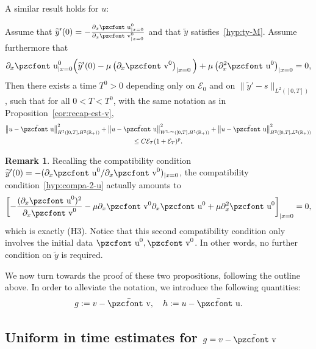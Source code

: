 \documentclass[10pt]{amsart}
\theoremstyle{definition}\newtheorem{defi}[theo]{Definition}\newtheorem{rema}[theo]{Remark}\newtheorem{exam}[theo]{Example}\newtheorem{exem}[theo]{Example}\newtheorem{nota}[theo]{Notation}
\newcommand{\mathpzc}[1]{\text{\pzcfont #1}}
\newcommand{\R}{\mathbb{R}}
\newcommand{\p}{\partial}
\newcommand{\bv}{\bar{\mathpzc{v}}}
\newcommand{\bu}{\bar{\mathpzc{u}}}
\newcommand{\cE}{\mathcal E}
\newcommand{\tv}{\mathpzc{v}}
\newcommand{\tu}{\mathpzc{u}}
\newcommand{\ty}{\widetilde{y}}
\begin{document}
A similar result holds for $u$:
\begin{prop}\label{prop:est-u}
Assume that $\ty'(0)=-\frac{\p_x \tu^0_{|x=0}}{\p_x \tv^0_{|x=0}}$ and that $\ty$ satisfies~\eqref{hyp:ty-M}. Assume furthermore that
\begin{equation}\label{hyp:compa-2-u}
\partial_x \tu^0_{|x=0}\Big(\ty'(0) -\mu \left(\partial_x \tv^0\right)_{|x=0} \Big) + \mu \left(\partial^2_x \tu^0\right)_{|x=0} = 0,
\end{equation}
Then there exists a time $T^0>0$ depending only on $\cE_0$ and on $\|\ty'-s\|_{L^2([0,T])}$, such that for all $0<T<T^0$, with the same notation as in Proposition~\ref{cor:recap-est-v},
\begin{multline*}
\left\|u-\bu\right\|_{H^1\left([0,T], H^2(\R_+)\right)}^2 + \left\|u-\bu\right\|_{W^{1,\infty}\left([0,T], H^1(\R_+)\right)}^2 + \left\|u-\bu\right\|_{H^2\left([0,T], L^2(\R_+)\right)}^2\\
\leq C \cE_T (1+ \cE_T)^p.
\end{multline*}
\end{prop}

\begin{rema}
Recalling the compatibility condition $\ty'(0)=-(\p_x \tu^0/\p_x \tv^0)_{|x=0}$, the compatibility condition~\eqref{hyp:compa-2-u} actually amounts to
\[
\left[-\frac{(\p_x \tu^0)^2}{\p_x \tv^0} - \mu \p_x \tv^0 \p_x \tu^0 + \mu \p_x^2 \tu^0\right]_{|x=0}=0,
\]
which is exactly (H3). Notice that this second compatibility condition only involves the initial data $\tu^0, \tv^0$. In other words, no further condition on $\ty$ is required.
\end{rema}



We now turn towards the proof of these two propositions, following the outline above. In order to alleviate the notation, we introduce the following quantities:
\[
g:=v-\bv,\quad h:=u-\bu.
\]

\subsection{Uniform in time estimates for \texorpdfstring{$g=v-\bv$}{g}}\label{sec:unif-est-g}
\end{document}
